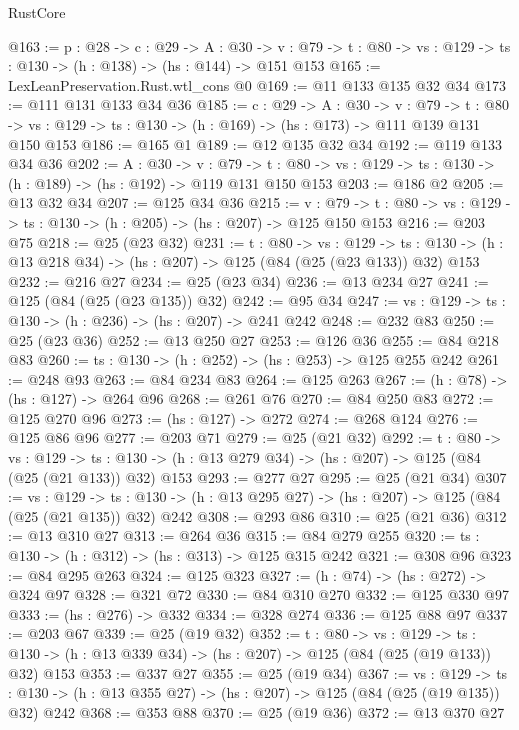 \begin{lexlean}{RustCore}
\begin{coremodule}
@163 := {p : @28} ->
  {c : @29} ->
  {A : @30} ->
  {v : @79} -> {t : @80} -> {vs : @129} -> {ts : @130} -> (h : @138) -> (hs : @144) -> @151 @153
@165 := LexLeanPreservation.Rust.wtl_cons @0
@169 := @11 @133 @135 @32 @34
@173 := @111 @131 @133 @34 @36
@185 := {c : @29} ->
  {A : @30} ->
  {v : @79} ->
  {t : @80} -> {vs : @129} -> {ts : @130} -> (h : @169) -> (hs : @173) -> @111 @139 @131 @150 @153
@186 := @165 @1
@189 := @12 @135 @32 @34
@192 := @119 @133 @34 @36
@202 := {A : @30} ->
  {v : @79} ->
  {t : @80} -> {vs : @129} -> {ts : @130} -> (h : @189) -> (hs : @192) -> @119 @131 @150 @153
@203 := @186 @2
@205 := @13 @32 @34
@207 := @125 @34 @36
@215 := {v : @79} ->
  {t : @80} -> {vs : @129} -> {ts : @130} -> (h : @205) -> (hs : @207) -> @125 @150 @153
@216 := @203 @75
@218 := @25 (@23 @32)
@231 := {t : @80} ->
  {vs : @129} ->
  {ts : @130} -> (h : @13 @218 @34) -> (hs : @207) -> @125 (@84 (@25 (@23 @133)) @32) @153
@232 := @216 @27
@234 := @25 (@23 @34)
@236 := @13 @234 @27
@241 := @125 (@84 (@25 (@23 @135)) @32)
@242 := @95 @34
@247 := {vs : @129} -> {ts : @130} -> (h : @236) -> (hs : @207) -> @241 @242
@248 := @232 @83
@250 := @25 (@23 @36)
@252 := @13 @250 @27
@253 := @126 @36
@255 := @84 @218 @83
@260 := {ts : @130} -> (h : @252) -> (hs : @253) -> @125 @255 @242
@261 := @248 @93
@263 := @84 @234 @83
@264 := @125 @263
@267 := (h : @78) -> (hs : @127) -> @264 @96
@268 := @261 @76
@270 := @84 @250 @83
@272 := @125 @270 @96
@273 := (hs : @127) -> @272
@274 := @268 @124
@276 := @125 @86 @96
@277 := @203 @71
@279 := @25 (@21 @32)
@292 := {t : @80} ->
  {vs : @129} ->
  {ts : @130} -> (h : @13 @279 @34) -> (hs : @207) -> @125 (@84 (@25 (@21 @133)) @32) @153
@293 := @277 @27
@295 := @25 (@21 @34)
@307 := {vs : @129} ->
  {ts : @130} -> (h : @13 @295 @27) -> (hs : @207) -> @125 (@84 (@25 (@21 @135)) @32) @242
@308 := @293 @86
@310 := @25 (@21 @36)
@312 := @13 @310 @27
@313 := @264 @36
@315 := @84 @279 @255
@320 := {ts : @130} -> (h : @312) -> (hs : @313) -> @125 @315 @242
@321 := @308 @96
@323 := @84 @295 @263
@324 := @125 @323
@327 := (h : @74) -> (hs : @272) -> @324 @97
@328 := @321 @72
@330 := @84 @310 @270
@332 := @125 @330 @97
@333 := (hs : @276) -> @332
@334 := @328 @274
@336 := @125 @88 @97
@337 := @203 @67
@339 := @25 (@19 @32)
@352 := {t : @80} ->
  {vs : @129} ->
  {ts : @130} -> (h : @13 @339 @34) -> (hs : @207) -> @125 (@84 (@25 (@19 @133)) @32) @153
@353 := @337 @27
@355 := @25 (@19 @34)
@367 := {vs : @129} ->
  {ts : @130} -> (h : @13 @355 @27) -> (hs : @207) -> @125 (@84 (@25 (@19 @135)) @32) @242
@368 := @353 @88
@370 := @25 (@19 @36)
@372 := @13 @370 @27

\end{coremodule}
\end{lexlean}
